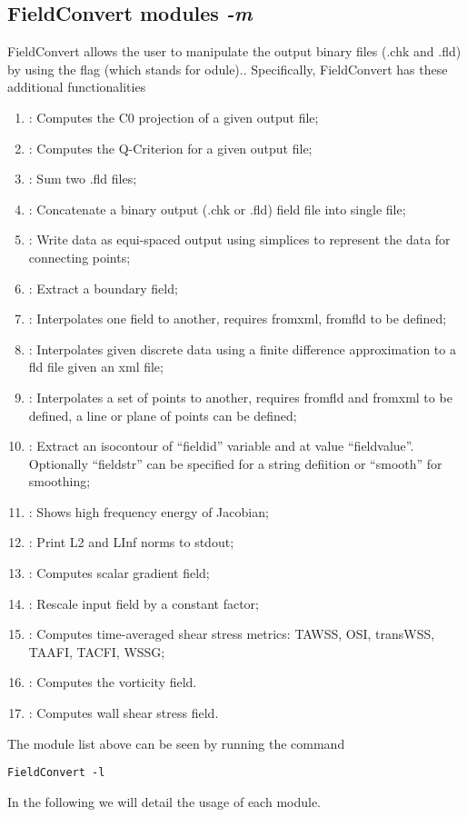 \subsection{FieldConvert modules \textit{-m}}
FieldConvert allows the user to manipulate the \nekpp output 
binary files (.chk and .fld) by using the flag  (which 
stands for odule).. 
Specifically, FieldConvert has these additional functionalities
%
\begin{enumerate}
\item {}: Computes the C0 projection of a given output file;
\item {}: Computes the Q-Criterion for a given output file;
\item {}: Sum two .fld files;
\item {}: Concatenate a \nekpp binary output (.chk or .fld) field file into single file;
\item {}: Write data as equi-spaced output using simplices to represent the data for connecting points;
\item {}: Extract a boundary field;
\item {}: Interpolates one field to another, requires fromxml, fromfld to be defined;
\item {}: Interpolates given discrete data using a finite difference approximation to a fld file given an xml file;
\item {}: Interpolates a set of points to another, requires fromfld and fromxml to be defined, a line or plane of points can be defined;
\item {}: Extract an isocontour of ``fieldid'' variable and at value ``fieldvalue''. Optionally ``fieldstr'' can be specified for a string defiition or ``smooth'' for smoothing; 
\item {}: Shows high frequency energy of Jacobian;
\item {}: Print L2 and LInf norms to stdout;
\item {}: Computes scalar gradient field;
\item {}: Rescale input field by a constant factor;
\item {}: Computes time-averaged shear stress metrics: TAWSS, OSI, transWSS, TAAFI, TACFI, WSSG;
\item {}: Computes the vorticity field.
\item {}: Computes wall shear stress field.
\end{enumerate}
The module list above can be seen by running the command
%
\begin{lstlisting}[style=BashInputStyle]
FieldConvert -l 
\end{lstlisting}
%
In the following we will detail the usage of each module.
%
%
%

